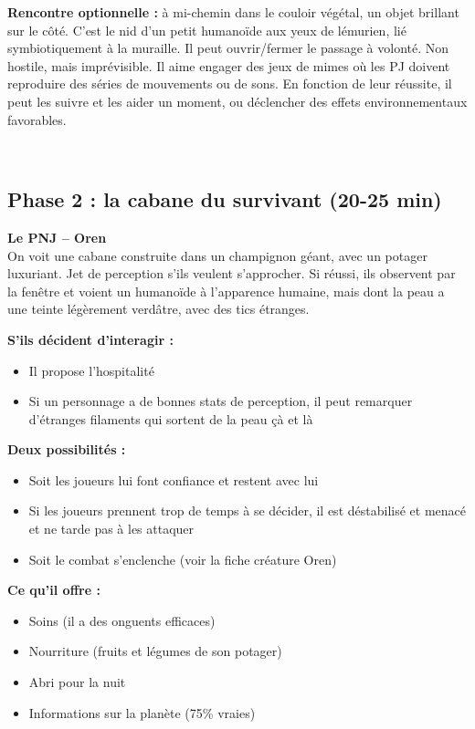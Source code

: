 \documentclass[10pt, a4paper]{article}
\newcommand{\stats}[1]{\vspace{0.3em}{\color{statviolet}\textbf{$\bigstar$ #1}}\vspace{0.2em}}
\newcommand{\sep}{\vspace{0.2em}\noindent\textcolor{biovert!30}{\hrulefill}\vspace{0.2em}}
\begin{document}
\textbf{Rencontre optionnelle :} à mi-chemin dans le couloir végétal, un objet brillant sur le côté. C'est le nid d'un petit humanoïde aux yeux de lémurien, lié symbiotiquement à la muraille. Il peut ouvrir/fermer le passage à volonté. Non hostile, mais imprévisible. Il aime engager des jeux de mimes où les PJ doivent reproduire des séries de mouvements ou de sons. En fonction de leur réussite, il peut les suivre et les aider un moment, ou déclencher des effets environnementaux favorables.

\stats{Gardien-lémurien}\\

\sep

\subsection*{Phase 2 : la cabane du survivant (20-25 min)}
\textbf{Le PNJ -- Oren}\\
On voit une cabane construite dans un champignon géant, avec un potager luxuriant.
Jet de perception s'ils veulent s'approcher.
Si réussi, ils observent par la fenêtre et voient un humanoïde à l'apparence humaine, mais dont la peau a une teinte légèrement verdâtre, avec des tics étranges.

\textbf{S'ils décident d'interagir :}
\begin{itemize}
    \item Il propose l'hospitalité
    \item Si un personnage a de bonnes stats de perception, il peut remarquer d'étranges filaments qui sortent de la peau çà et là
\end{itemize}

\textbf{Deux possibilités :}
\begin{itemize}
    \item Soit les joueurs lui font confiance et restent avec lui
    \item Si les joueurs prennent trop de temps à se décider, il est déstabilisé et menacé et ne tarde pas à les attaquer
    \item Soit le combat s'enclenche (voir la fiche créature Oren)
\end{itemize}

\textbf{Ce qu'il offre :}
\begin{itemize}
    \item Soins (il a des onguents efficaces)
    \item Nourriture (fruits et légumes de son potager)
    \item Abri pour la nuit
    \item Informations sur la planète (75\% vraies)
\end{itemize}
\end{document}

